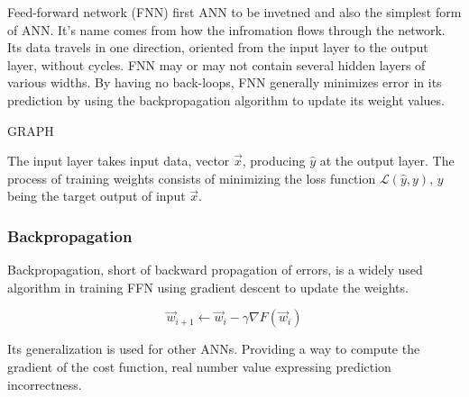 {\color{red}Feed-forward network (FNN) first ANN to be invetned and also the simplest form of ANN. It's name comes from how the infromation flows through the network. Its data travels in one direction, oriented from the input layer to the output layer, without cycles.\cite{ffnbrilliant} 
}
FNN may or may not contain several hidden layers of various widths. By having no back-loops, FNN generally minimizes error in its prediction by using the backpropagation algorithm to update its weight values.\cite{mainTypesANN}

GRAPH

The input layer takes input data, vector $\vec{x}$, producing $\hat{y}$ at the output layer. The process of training weights
 consists of minimizing the loss function $\mathcal{L}(\hat{y},y)$, $y$ being the target output of input $\vec{x}$.\cite{lipton2015critical}

\subsubsection{Backpropagation}
Backpropagation, short of backward propagation of errors, is a widely used algorithm in training FFN using gradient descent to update the weights. \cite{birlliantbackprop}

\begin{equation}
    {\vec{w}_{i+1} \leftarrow \vec{w}_i - \gamma \nabla F(\vec{w}_i)}
\end{equation}

Its generalization is used for other ANNs. Providing a way to compute the gradient of the cost function,
 real number value expressing prediction incorrectness.\cite{Goodfellow-et-al-2016}
